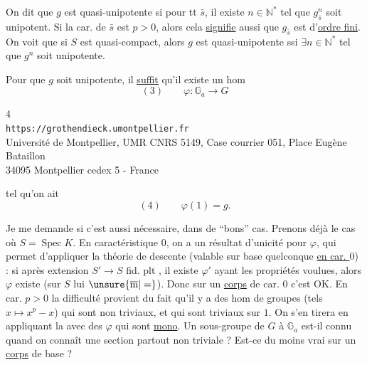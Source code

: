 On dit que $g$ est quasi-unipotente si pour tt $\bar s$, il existe
$n\in\mathbb N^*$ tel que $g_{\bar s}^{n}$ soit unipotent.
Si la car. de $\bar s$ est $p>0$, alors cela \uline{signifie} aussi que
$g_{\bar s}$ est d'\uline{ordre fini}. On voit que si $S$ est
quasi-compact, alors $g$ est quasi-unipotente ssi
$\exists n\in\mathbb N^*$ tel que $g^n$ soit unipotente.


 Pour que $g$ soit unipotente, il \uline{suffit} qu'il existe un hom
\[
(3)\qquad \varphi:\mathbb G_a\longrightarrow G
\]

\begin{center}
\small
4\\
\texttt{https://grothendieck.umontpellier.fr}\\
Université de Montpellier, UMR CNRS 5149, Case courrier 051, Place Eugène Bataillon\\
34095 Montpellier cedex 5 - France
\end{center}


tel qu'on ait
\[
(4)\qquad \varphi(1)=g.
\]

Je me demande si c'est aussi nécessaire, dans de ``bons'' cas. Prenons déjà le
cas où $S=\operatorname{Spec}K$. En caractéristique $0$, on a un résultat
d'unicité pour $\varphi$, qui permet d'appliquer la théorie de descente
(valable sur base quelconque \uline{en car. $0$}) : si après extension
$S'\longrightarrow S$ fid. plt , il existe $\varphi'$ ayant
les propriétés voulues, alors $\varphi$ existe
(sur $S$ lui $\unsure{\overline{\mathrm m}|=}$).
Donc sur un \uline{corps} de car. $0$ c'est OK. En car. $p>0$ la difficulté
provient du fait qu'il y a des hom de groupes
(tels $x\mapsto x^p-x$) qui sont  non triviaux, et qui sont
triviaux sur $1$. On s'en tirera  en appliquant
la  avec des $\varphi$ qui sont \uline{mono}.
 
Un sous-groupe de $G$  à $\mathbb G_a$ est-il connu quand
on connaît une section partout non triviale ? Est-ce du moins vrai sur un
\uline{corps} de base ?

